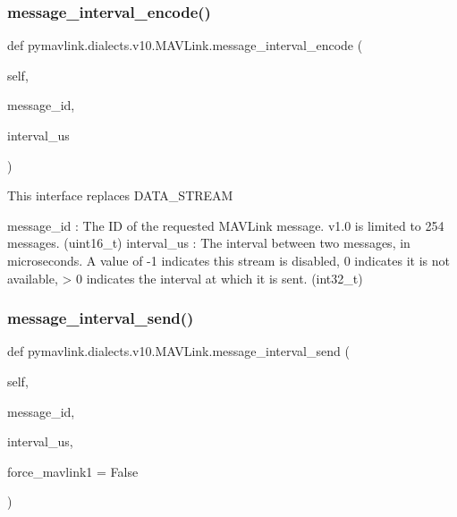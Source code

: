 \begin{DoxyVerb}
\begin{DoxyVerb}
\begin{DoxyVerb}
\begin{DoxyVerb}
\subsubsection{\texorpdfstring{message\+\_\+interval\+\_\+encode()}{message\_interval\_encode()}}
{\footnotesize\ttfamily def pymavlink.\+dialects.\+v10.\+M\+A\+V\+Link.\+message\+\_\+interval\+\_\+encode (\begin{DoxyParamCaption}\item[{}]{self,  }\item[{}]{message\+\_\+id,  }\item[{}]{interval\+\_\+us }\end{DoxyParamCaption})}

\begin{DoxyVerb}This interface replaces DATA_STREAM

message_id                : The ID of the requested MAVLink message. v1.0 is limited to 254 messages. (uint16_t)
interval_us               : The interval between two messages, in microseconds. A value of -1 indicates this stream is disabled, 0 indicates it is not available, > 0 indicates the interval at which it is sent. (int32_t)\end{DoxyVerb}
 \mbox{\label{classpymavlink_1_1dialects_1_1v10_1_1MAVLink_ab2e87e5b4ed29e01a269e3db9f9ed659}} 
\subsubsection{\texorpdfstring{message\+\_\+interval\+\_\+send()}{message\_interval\_send()}}
{\footnotesize\ttfamily def pymavlink.\+dialects.\+v10.\+M\+A\+V\+Link.\+message\+\_\+interval\+\_\+send (\begin{DoxyParamCaption}\item[{}]{self,  }\item[{}]{message\+\_\+id,  }\item[{}]{interval\+\_\+us,  }\item[{}]{force\+\_\+mavlink1 = {\ttfamily False} }\end{DoxyParamCaption})}


\end{DoxyVerb}
\end{DoxyVerb}
\end{DoxyVerb}
\end{DoxyVerb}
